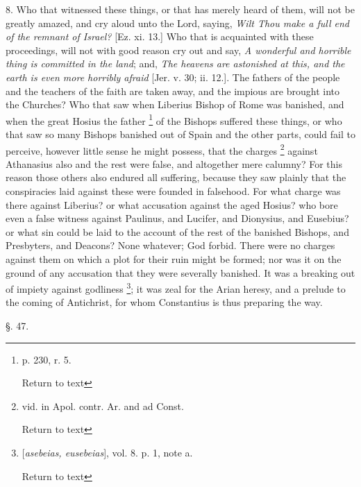8. Who that witnessed these things, or that has
merely heard of them, will not be greatly amazed, and cry aloud unto
the Lord, saying, \emph{Wilt Thou make a full end of the remnant of
Israel?} [Ez. xi. 13.] Who that is acquainted with these
proceedings, will not with good reason cry out and say, \emph{A wonderful
and horrible thing is committed in the land}; and, \emph{The heavens
are astonished at this, and the earth is even more horribly afraid}
[Jer. v. 30; ii. 12.]. The fathers of the people and the teachers of
the faith are taken away, and the impious are brought into the
Churches? Who that saw when Liberius Bishop of Rome was banished, and
when the great Hosius the father \footnote{p. 230, r. 5.

Return to text} of the Bishops suffered these things, or who that saw so many
Bishops banished out of Spain and the other parts, could fail to
perceive, however little sense he might possess, that the charges \footnote{vid. in Apol. contr. Ar. and ad Const.

Return to text} against Athanasius also and the rest were false, and
altogether mere calumny? For this reason those others also endured all
suffering, because they saw plainly that the conspiracies laid against
these were founded in falsehood. For what charge was there against
Liberius? or what accusation against the aged Hosius? who bore even a
false witness against Paulinus, and Lucifer, and Dionysius, and
Eusebius? or what sin could be laid to the account of the rest of the
banished Bishops, and Presbyters, and Deacons? None whatever; God
forbid. There were no charges against them on which a plot for their
ruin might be formed; nor was it on the ground of any accusation that
they were severally banished. It was a breaking out of impiety against
godliness \footnote{[\emph{asebeias, eusebeias}], vol. 8. p. 1, note a.

Return to text}; it was
zeal for the Arian heresy, and a prelude to the coming of Antichrist,
for whom Constantius is thus preparing the way.


§. 47.

